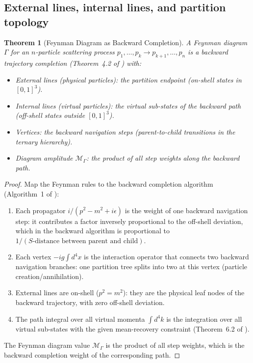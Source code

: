 \documentclass[twocolumn,10pt,a4paper]{article}
\theoremstyle{thmstyle}
\newtheorem{theorem}{Theorem}[section]
\theoremstyle{definition}
\theoremstyle{remark}
\begin{document}
\subsection{External lines, internal lines, and partition topology}

\begin{theorem}[Feynman Diagram as Backward Completion]
\label{thm:feynman_backward}
A Feynman diagram $\Gamma$ for an $n$-particle scattering process
$p_1,\ldots,p_k \to p_{k+1},\ldots,p_n$ is a backward trajectory
completion (Theorem~4.2 of \citealt{companion:trajectory}) with:
\begin{itemize}[nosep]
\item External lines (physical particles): the partition endpoint
  (on-shell states in $[0,1]^3$).
\item Internal lines (virtual particles): the virtual sub-states of the
  backward path (off-shell states outside $[0,1]^3$).
\item Vertices: the backward navigation steps
  (parent-to-child transitions in the ternary hierarchy).
\item Diagram amplitude $\mathcal{M}_\Gamma$: the product of all step weights
  along the backward path.
\end{itemize}
\end{theorem}

\begin{proof}
Map the Feynman rules to the backward completion algorithm
(Algorithm~1 of \citealt{companion:trajectory}):
\begin{enumerate}[nosep,label=(\roman*)]
\item Each propagator $i/(p^2-m^2+i\epsilon)$ is the weight of one backward
  navigation step: it contributes a factor inversely proportional to the
  off-shell deviation, which in the backward algorithm is proportional
  to $1/(S\text{-distance between parent and child})$.
\item Each vertex $-ig\int d^4x$ is the interaction operator that
  connects two backward navigation branches: one partition tree splits
  into two at this vertex (particle creation/annihilation).
\item External lines are on-shell ($p^2 = m^2$): they are the physical
  leaf nodes of the backward trajectory, with zero off-shell deviation.
\item The path integral over all virtual momenta $\int d^4k$ is the
  integration over all virtual sub-states with the given mean-recovery
  constraint (Theorem~6.2 of \citealt{companion:trajectory}).
\end{enumerate}
The Feynman diagram value $\mathcal{M}_\Gamma$ is the product of all step
weights, which is the backward completion weight of the corresponding path.
\end{proof}
\end{document}

